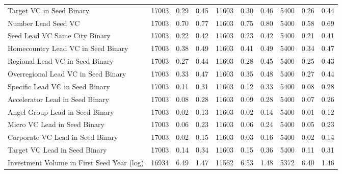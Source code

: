{\begin{table}[!h]
{\begin{tabular}[t]{lrrrrrrrrr}
Target VC in Seed Binary & 17003 & 0.29 & 0.45 & 11603 & 0.30 & 0.46 & 5400 & 0.26 & 0.44\\
Number Lead Seed VC & 17003 & 0.70 & 0.77 & 11603 & 0.75 & 0.80 & 5400 & 0.58 & 0.69\\
Seed Lead VC Same City Binary & 17003 & 0.22 & 0.42 & 11603 & 0.23 & 0.42 & 5400 & 0.21 & 0.41\\
Homecountry Lead VC in Seed Binary & 17003 & 0.38 & 0.49 & 11603 & 0.41 & 0.49 & 5400 & 0.34 & 0.47\\
\addlinespace
Regional Lead VC in Seed Binary & 17003 & 0.27 & 0.44 & 11603 & 0.28 & 0.45 & 5400 & 0.25 & 0.43\\
Overregional Lead VC in Seed Binary & 17003 & 0.33 & 0.47 & 11603 & 0.35 & 0.48 & 5400 & 0.27 & 0.44\\
Specific Lead VC in Seed Binary & 17003 & 0.11 & 0.31 & 11603 & 0.12 & 0.33 & 5400 & 0.08 & 0.28\\
Accelerator Lead in Seed Binary & 17003 & 0.08 & 0.28 & 11603 & 0.09 & 0.28 & 5400 & 0.07 & 0.26\\
Angel Group Lead in Seed Binary & 17003 & 0.02 & 0.13 & 11603 & 0.02 & 0.14 & 5400 & 0.01 & 0.12\\
\addlinespace
Micro VC Lead in Seed Binary & 17003 & 0.06 & 0.23 & 11603 & 0.06 & 0.24 & 5400 & 0.05 & 0.23\\
Corporate VC Lead in Seed Binary & 17003 & 0.02 & 0.15 & 11603 & 0.03 & 0.16 & 5400 & 0.02 & 0.14\\
Target VC Lead in Seed Binary & 17003 & 0.14 & 0.34 & 11603 & 0.15 & 0.36 & 5400 & 0.11 & 0.31\\
Investment Volume in First Seed Year (log) & 16934 & 6.49 & 1.47 & 11562 & 6.53 & 1.48 & 5372 & 6.40 & 1.46\\
\bottomrule
\end{tabular}}
\end{table}
}
